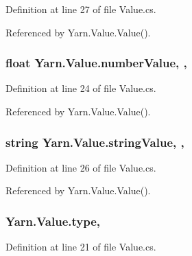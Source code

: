Definition at line 27 of file Value.\-cs.



Referenced by Yarn.\-Value.\-Value().

\hypertarget{a00167_ae1892c1c7a8177537d1caa39a2e51da6}{
\subsubsection[{number\-Value}]{\setlength{\rightskip}{0pt plus 5cm}float Yarn.\-Value.\-number\-Value\hspace{0.3cm}{\ttfamily [get]}, {\ttfamily [set]}, {\ttfamily [package]}}}\label{a00167_ae1892c1c7a8177537d1caa39a2e51da6}


Definition at line 24 of file Value.\-cs.



Referenced by Yarn.\-Value.\-Value().

\hypertarget{a00167_add1b07146f1a9e4b655b33c93d07dff9}{
\subsubsection[{string\-Value}]{\setlength{\rightskip}{0pt plus 5cm}string Yarn.\-Value.\-string\-Value\hspace{0.3cm}{\ttfamily [get]}, {\ttfamily [set]}, {\ttfamily [package]}}}\label{a00167_add1b07146f1a9e4b655b33c93d07dff9}


Definition at line 26 of file Value.\-cs.



Referenced by Yarn.\-Value.\-Value().

\hypertarget{a00167_a6d5820fafa766911b9da84d1ed33e51a}{
\subsubsection[{type}]{ Yarn.\-Value.\-type\hspace{0.3cm}{\ttfamily [get]}, {\ttfamily [set]}}}\label{a00167_a6d5820fafa766911b9da84d1ed33e51a}


Definition at line 21 of file Value.\-cs.



